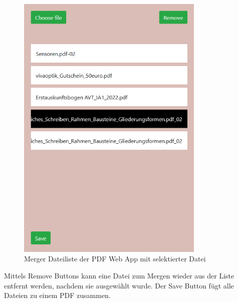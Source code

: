 \begin{figure}[!htbp]
	\centering
	\includegraphics[width=0.8\textwidth]{"images/mergelist.png"}
	\caption{Merger Dateiliste der PDF Web App mit selektierter Datei}
	\label{fig:mergelist}
\end{figure}
Mittels Remove Buttons kann eine Datei zum Mergen wieder aus der Liste entfernt werden, nachdem sie ausgewählt wurde. Der Save Button fügt alle Dateien zu einem PDF zusammen.




